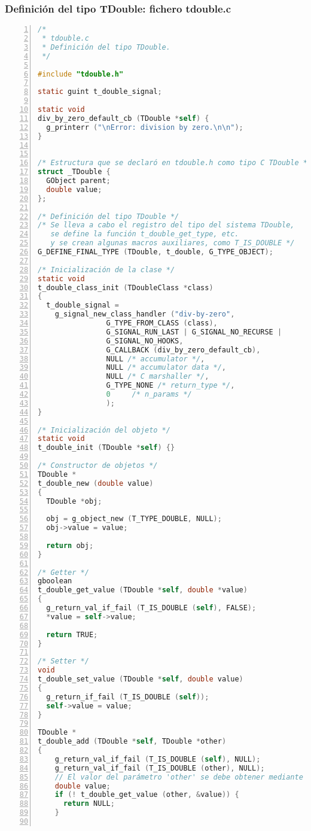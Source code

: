 \subsubsection{Definición del tipo \textsf{TDouble}: fichero \textsf{tdouble.c}}
\begin{lstlisting}[language=C, numbers=left]
/*
 * tdouble.c
 * Definición del tipo TDouble.
 */

#include "tdouble.h"

static guint t_double_signal;

static void
div_by_zero_default_cb (TDouble *self) {
  g_printerr ("\nError: division by zero.\n\n");
}


/* Estructura que se declaró en tdouble.h como tipo C TDouble */
struct _TDouble {
  GObject parent;
  double value;
};

/* Definición del tipo TDouble */
/* Se lleva a cabo el registro del tipo del sistema TDouble,
   se define la función t_double_get_type, etc.
   y se crean algunas macros auxiliares, como T_IS_DOUBLE */
G_DEFINE_FINAL_TYPE (TDouble, t_double, G_TYPE_OBJECT);

/* Inicialización de la clase */
static void
t_double_class_init (TDoubleClass *class)
{
  t_double_signal =
    g_signal_new_class_handler ("div-by-zero",
				G_TYPE_FROM_CLASS (class),
				G_SIGNAL_RUN_LAST | G_SIGNAL_NO_RECURSE |
				G_SIGNAL_NO_HOOKS,
				G_CALLBACK (div_by_zero_default_cb),
				NULL /* accumulator */,
				NULL /* accumulator data */,
				NULL /* C marshaller */,
				G_TYPE_NONE /* return_type */,
				0     /* n_params */
				);
}

/* Inicialización del objeto */
static void
t_double_init (TDouble *self) {}

/* Constructor de objetos */
TDouble *
t_double_new (double value)
{
  TDouble *obj;
  
  obj = g_object_new (T_TYPE_DOUBLE, NULL);
  obj->value = value;
  
  return obj;
}

/* Getter */
gboolean
t_double_get_value (TDouble *self, double *value)
{
  g_return_val_if_fail (T_IS_DOUBLE (self), FALSE);
  *value = self->value;
  
  return TRUE;
}

/* Setter */
void
t_double_set_value (TDouble *self, double value)
{
  g_return_if_fail (T_IS_DOUBLE (self));
  self->value = value;
}

TDouble *
t_double_add (TDouble *self, TDouble *other)
{
    g_return_val_if_fail (T_IS_DOUBLE (self), NULL);
    g_return_val_if_fail (T_IS_DOUBLE (other), NULL);
    // El valor del parámetro 'other' se debe obtener mediante el método 'getter'
    double value;
    if (! t_double_get_value (other, &value)) {
      return NULL;
    }
    

\end{lstlisting}
